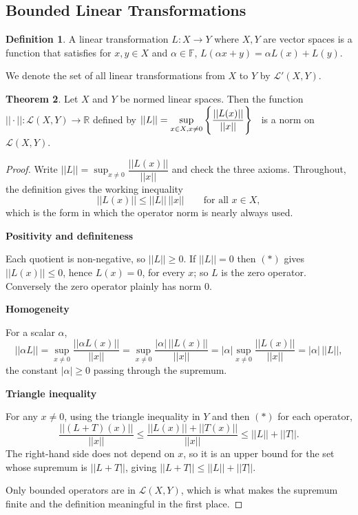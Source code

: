 \documentclass[11pt,a4paper]{article}
\theoremstyle{definition}
\newtheorem{thm}{Theorem}[section]
\newtheorem{defn}[thm]{Definition}
\newcommand{\subhead}[1]{%
  \par\medskip\noindent\textbf{#1}\par\nobreak\smallskip}
\begin{document}
\subsection{Bounded Linear Transformations}

\begin{defn}
A linear transformation $L:X\rightarrow Y$ where $X,Y$ are vector spaces is a function that satisfies for $x,y\in X$ and $\alpha \in \mathbb{F}$, $L(\alpha x+y)=\alpha L(x)+L(y)$.


We denote the set of all linear transformations from $X$ to $Y$ by $\mathcal{L}'(X,Y)$.

\end{defn}


\begin{thm}
Let $X$ and $Y$ be normed linear spaces. Then the function $||\cdot||:\mathcal{L}(X,Y)\rightarrow \mathbb{R}$ defined by \hspace{0.2cm}$\displaystyle{||L||=\sup_{x\in X,x\neq 0}\Bigg\{\frac{||L(x)||}{||x||}\Bigg\}}\hspace{0.2cm}$ is a norm on $\mathcal{L}(X,Y)$.

\end{thm}

\begin{proof}
Write $||L||=\sup_{x\neq 0}\dfrac{||L(x)||}{||x||}$ and check the three axioms.
Throughout, the definition gives the working inequality
\begin{equation}
||L(x)||\leq ||L||\,||x||\qquad\text{for all }x\in X, \tag{$\ast$}
\end{equation}
which is the form in which the operator norm is nearly always used.

\subhead{Positivity and definiteness}
Each quotient is non-negative, so $||L||\geq 0$. If $||L||=0$ then $(\ast)$
gives $||L(x)||\leq 0$, hence $L(x)=0$, for every $x$; so $L$ is the zero
operator. Conversely the zero operator plainly has norm $0$.

\subhead{Homogeneity}
For a scalar $\alpha$,
$$||\alpha L||=\sup_{x\neq 0}\frac{||\alpha L(x)||}{||x||}
=\sup_{x\neq 0}\frac{|\alpha|\,||L(x)||}{||x||}
=|\alpha|\sup_{x\neq 0}\frac{||L(x)||}{||x||}=|\alpha|\,||L||,$$
the constant $|\alpha|\geq 0$ passing through the supremum.

\subhead{Triangle inequality}
For any $x\neq 0$, using the triangle inequality in $Y$ and then $(\ast)$ for
each operator,
$$\frac{||(L+T)(x)||}{||x||}\leq\frac{||L(x)||+||T(x)||}{||x||}
\leq ||L||+||T|| .$$
The right-hand side does not depend on $x$, so it is an upper bound for the set
whose supremum is $||L+T||$, giving $||L+T||\leq ||L||+||T||$.

Only bounded operators are in $\mathcal{L}(X,Y)$, which is what makes the
supremum finite and the definition meaningful in the first place.
\end{proof}
\end{document}
